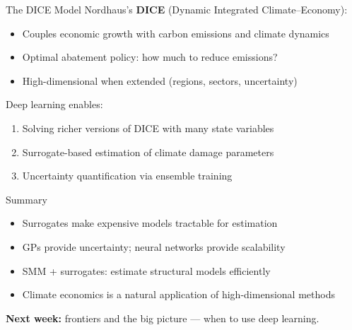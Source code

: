 \documentclass[aspectratio=169, 10pt]{beamer}
\begin{document}
\begin{frame}{The DICE Model}
Nordhaus's \textbf{DICE} (Dynamic Integrated Climate--Economy):

\bigskip
\begin{itemize}
\item Couples economic growth with carbon emissions and climate dynamics
\item Optimal abatement policy: how much to reduce emissions?
\item High-dimensional when extended (regions, sectors, uncertainty)
\end{itemize}

\bigskip
Deep learning enables:
\begin{enumerate}
\item Solving richer versions of DICE with many state variables
\item Surrogate-based estimation of climate damage parameters
\item Uncertainty quantification via ensemble training
\end{enumerate}
\end{frame}

\begin{frame}{Summary}
\begin{itemize}
\item Surrogates make expensive models tractable for estimation
\item GPs provide uncertainty; neural networks provide scalability
\item SMM + surrogates: estimate structural models efficiently
\item Climate economics is a natural application of high-dimensional methods
\end{itemize}

\bigskip
\textbf{Next week:} frontiers and the big picture --- when to use deep learning.
\end{frame}
\end{document}
